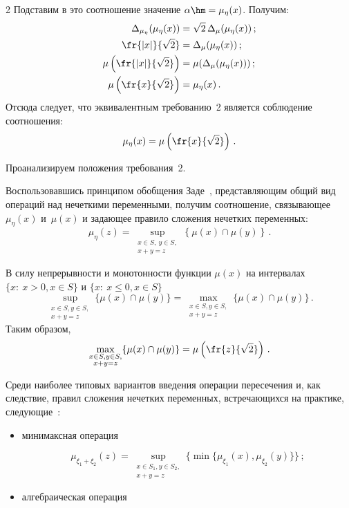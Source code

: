 \begin{multicols}{2}
  Подставим в это соотношение значение $\alpha\hm=\mu_\eta(x)$. Получим:
  \begin{align*}
  \Delta_{\mu_\eta}(\mu_\eta(x)) &=\sqrt{2}\,\Delta_\mu(\mu_\eta(x))\,;\\
  \fr{\vert x\vert}{\sqrt{2}} &=\Delta_\mu (\mu_\eta(x))\,;\\
  \mu\left( \fr{\vert x\vert}{\sqrt{2}}\right) &=\mu(\Delta_\mu(\mu_\eta(x)))\,;\\
  \mu\left(\fr{x}{\sqrt{2}}\right) &=\mu_\eta(x)\,.
  \end{align*}
  Отсюда следует, что эквивалентным требованию~2 является 
соблюдение соотношения:
  $$
  \mu_\eta(x) =\mu\left( \fr{x}{\sqrt{2}}\right)\,.
  $$
  
Проанализируем положения требования~2.
  
  Воспользовавшись принципом обобщения Заде~\cite{11sem}, 
представляющим общий вид операций над нечеткими переменными, получим 
соотношение, связывающее~$\mu_\eta(x)$ и~$\mu(x)$ и задающее правило 
сложения нечетких переменных: 
  $$
  \mu_\eta(z)=\sup\limits_{\substack{{x\in S,\ y\in S,}\\{x+y=z}}}
  \left\{ \mu(x)\cap \mu(y)\right\}\,.
  $$
  
  В силу непрерывности и монотонности функции $\mu(x)$ на интервалах $\{x:\ 
x>0, x\in S\}$ и $\{x:\ x\leq 0, x\in S\}$ 
  $$
  \sup\limits_{\substack{{x\in S, y\in S,}\\{x+y=z}}} \{\mu(x)\cap 
\mu(y)\}=\max\limits_{\substack{{x\in S, y\in S,}\\{x+y=z}}} \{\mu(x)\cap \mu(y)\}\,.
$$ 
Таким образом, 
\begin{equation}
\max\limits_{\substack{{x\in S, y\in  S,}\\{x+y=z}}}\{\mu(x)\cap \mu(y)\}=\mu\left(\fr{z}{\sqrt{2}}\right)\,.
\label{e0-sem}
\end{equation}

Среди наиболее 
типовых вариантов введения операции пересечения и, как следствие, правил 
сложения нечетких переменных, встречающихся на практике, 
сле\-ду\-ющие~\cite{13sem}:
  \begin{itemize}
  \item минимаксная операция 
  
    \noindent
$$
\mu_{\xi_1+\xi_2}(z)=\sup\limits_{\substack{{x\in S_1, y\in S_2,}\\{x+y=z}}} 
\{\min\{\mu_{\xi_1}(x),\mu_{\xi_2}(y)\}\}\,;
$$
  \item алгебраическая операция 
  

\end{itemize}
\end{multicols}
